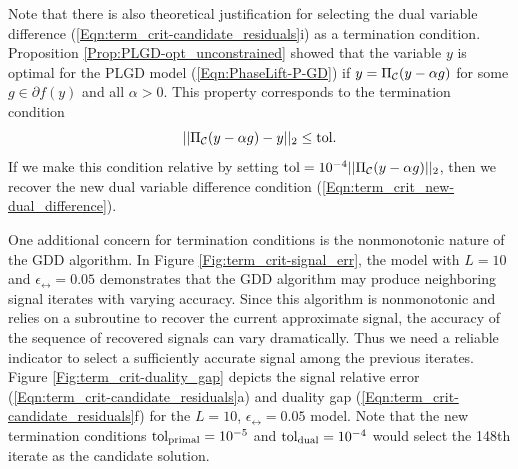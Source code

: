 Note that there is also theoretical justification for selecting the dual variable difference (\ref{Eqn:term_crit-candidate_residuals}i) as a termination condition.  Proposition \ref{Prop:PLGD-opt_unconstrained} showed that the variable $y$ is optimal for the PLGD model (\ref{Eqn:PhaseLift-P-GD}) if $y = \Pi_{\mathcal C}(y - \alpha g)$ for some $g \in \partial f(y)$ and all $\alpha > 0$.  This property corresponds to the termination condition 
\begin{equation*}
|| \Pi_{\mathcal C}(y - \alpha g) - y ||_2 \leq \text{tol}.
\end{equation*}
If we make this condition relative by setting $\text{tol} = 10^{-4}||\Pi_{\mathcal C}(y - \alpha g)||_2$, then we recover the new dual variable difference condition (\ref{Eqn:term_crit_new-dual_difference}).






One additional concern for termination conditions is the nonmonotonic nature of the GDD algorithm.  In Figure \ref{Fig:term_crit-signal_err}, the model with $L = 10$ and $\epsilon_\rel = 0.05$ demonstrates that the GDD algorithm may produce neighboring signal iterates with varying accuracy.  Since this algorithm is nonmonotonic and relies on a subroutine to recover the current approximate signal, the accuracy of the sequence of recovered signals can vary dramatically.  Thus we need a reliable indicator to select a sufficiently accurate signal among the previous iterates.  Figure \ref{Fig:term_crit-duality_gap} depicts the signal relative error (\ref{Eqn:term_crit-candidate_residuals}a) and duality gap (\ref{Eqn:term_crit-candidate_residuals}f) for the $L = 10$, $\epsilon_\rel = 0.05$ model.  Note that the new termination conditions $\textnormal{tol}_\text{primal} = 10^{-5}$ and $\textnormal{tol}_\text{dual} = 10^{-4}$ would select the 148th iterate as the candidate solution.  



